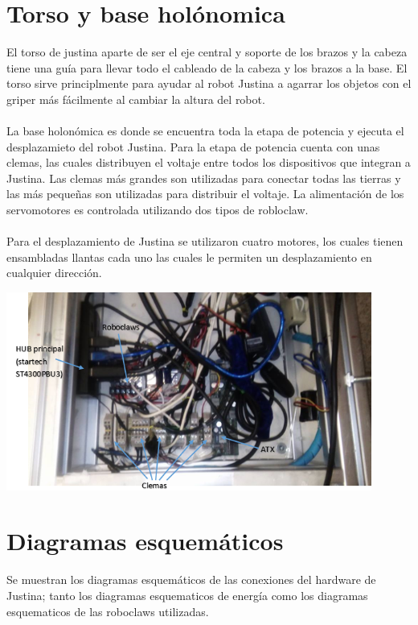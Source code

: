 \documentclass[user_manual.tex]{subfiles}
\begin{document}
\section{Torso y base holónomica}
El torso de justina aparte de ser el eje central y soporte de los brazos y la cabeza tiene una guía para llevar todo el cableado de la cabeza y los brazos a la base. El torso sirve principlmente para ayudar al robot Justina a agarrar los objetos con el griper más fácilmente al cambiar la altura del robot. \\
\\
La base holonómica es donde se encuentra toda la etapa de potencia y ejecuta el desplazamieto del robot Justina. Para la etapa de potencia cuenta con unas clemas, las cuales distribuyen el voltaje entre todos los dispositivos que integran a Justina. Las clemas más grandes son utilizadas para conectar todas las tierras y las más pequeñas son utilizadas para distribuir el voltaje. La alimentación de los servomotores es controlada utilizando dos tipos
de robloclaw.\\
\\ Para el desplazamiento de Justina se utilizaron cuatro motores, los cuales tienen ensambladas llantas cada uno las cuales le permiten un desplazamiento en cualquier dirección.

\begin{center}
\includegraphics[width=0.9\textwidth]{Figures/Hardware/Diagramas/Base.png}
\label{fig:Hardware:Diagramas:Justina:Base}
\end{center}

\section{Diagramas esquemáticos}
Se muestran los diagramas esquemáticos de las conexiones del hardware de Justina; tanto los diagramas esquematicos de energía como los diagramas esquematicos de las roboclaws utilizadas.
\end{document}
